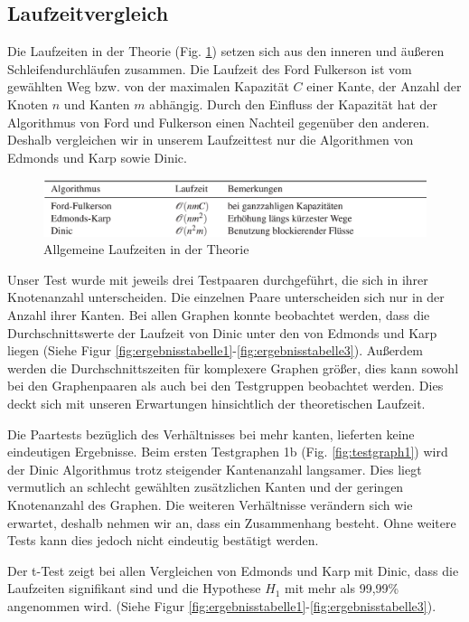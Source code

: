 \documentclass[a4paper]{llncs}
\begin{document}
\subsection{Laufzeitvergleich}
Die Laufzeiten in der Theorie (Fig. \ref{fig:lzvergleich}) setzen sich aus den inneren und äußeren Schleifendurchläufen zusammen.
Die Laufzeit des Ford Fulkerson ist vom ge\-wählten Weg bzw. von der maximalen Kapazität $C$ einer Kante, der Anzahl der Knoten $n$ und Kanten $m$  abhängig.
Durch den Einfluss der Kapazität hat der Algorithmus von Ford und Fulkerson einen Nachteil gegenüber den anderen.
Deshalb vergleichen wir in unserem Laufzeittest nur die Algorithmen von Edmonds und Karp sowie Dinic.
\begin{figure}[H] 
  \centering
     \includegraphics[scale=0.42]{lzvergleich} 
  \caption{Allgemeine Laufzeiten in der Theorie \citep{GKuA}}
  \label{fig:lzvergleich}
\end{figure}
Unser Test wurde mit jeweils drei Testpaaren durchgeführt, die sich in ihrer Knotenanzahl unterscheiden.
Die einzelnen Paare unterscheiden sich nur in der Anzahl ihrer Kanten.
Bei allen Graphen konnte beobachtet werden, dass die Durchschnittswerte der Laufzeit von Dinic unter den von Edmonds und Karp liegen (Siehe Figur \ref{fig:ergebnisstabelle1}-\ref{fig:ergebnisstabelle3}). 
Außerdem werden die Durchschnittszeiten für komplexere Graphen größer, dies kann sowohl bei den Graphenpaaren als auch bei den Testgruppen beobachtet werden.
Dies deckt sich mit unseren Erwartungen hinsichtlich der theoretischen Laufzeit.

Die Paartests bezüglich des Verhältnisses bei mehr kanten, lieferten keine eindeutigen Ergebnisse. Beim ersten Testgraphen 1b (Fig. \ref{fig:testgraph1}) wird der Dinic Algorithmus trotz steigender Kantenanzahl langsamer. Dies liegt vermutlich an schlecht gewählten zusätzlichen Kanten und der geringen Knotenanzahl des Graphen.
Die weiteren Verhältnisse verändern sich wie erwartet, deshalb nehmen wir an, dass ein Zusammenhang besteht.
Ohne weitere Tests kann dies jedoch nicht eindeutig bestätigt werden.

Der t-Test zeigt bei allen Vergleichen von Edmonds und Karp mit Dinic, dass die Laufzeiten signifikant sind und die Hypothese $H_{1}$ mit mehr als 99,99\% angenommen wird. (Siehe Figur \ref{fig:ergebnisstabelle1}-\ref{fig:ergebnisstabelle3}).
\end{document}

